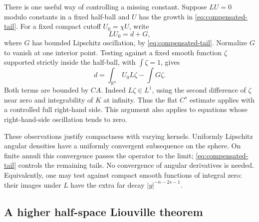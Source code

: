 \documentclass[11pt]{article}
\numberwithin{equation}{section}
\newcommand{\R}{\mathbb R}
\begin{document}
There is one useful way of controlling a missing constant. Suppose $LU=0$
modulo constants in a fixed half-ball and $U$ has the growth in
\eqref{eq:compensated-tail}. For a fixed compact cutoff $U_0=\chi U$, write
\[
 LU_0=d+G,
\]
where $G$ has bounded Lipschitz oscillation, by \eqref{eq:compensated-tail}.
Normalize $G$ to vanish at one interior point. Testing against a fixed smooth
function $\zeta$ supported strictly inside the half-ball, with
$\int\zeta=1$, gives
\begin{equation}\label{eq:constant-test}
 d=\int_{\R^n} U_0 L\zeta-\int G\zeta.
\end{equation}
Both terms are bounded by $CA$. Indeed $L\zeta\in L^1$, using the
second difference of $\zeta$ near zero and integrability of $K$ at infinity.
Thus the flat $C^s$ estimate applies with a controlled full right-hand side.
This argument also applies to equations whose right-hand-side oscillation
tends to zero.

These observations justify compactness with varying kernels. Uniformly
Lipschitz angular densities have a uniformly convergent subsequence on the
sphere. On finite annuli this convergence passes the operator to the limit;
\eqref{eq:compensated-tail} controls the remaining tails. No convergence of
angular derivatives is needed. Equivalently, one may test against compact
smooth functions of integral zero: their images under $L$ have the extra
far decay $|y|^{-n-2s-1}$.

\subsection{A higher half-space Liouville theorem}
\end{document}
